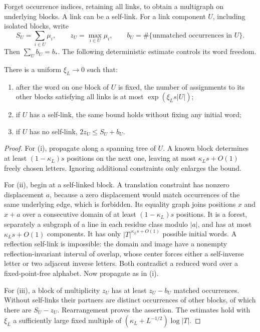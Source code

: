 Forget occurrence indices, retaining all links, to obtain a multigraph on underlying blocks. A link can be a self-link. For a link component $U$, including isolated blocks, write
\[
 S_U=\sum_{i\in U}\mu_i,\qquad z_U=\max_{i\in U}\mu_i,
 \qquad b_U=\#\{\text{unmatched occurrences in }U\}.
\]
Then $\sum_U b_U=b_*$. The following deterministic estimate controls its word freedom.
\begin{lemma}\label{lem:link-freedom}
There is a uniform $\xi_L\to0$ such that:
\begin{enumerate}[label=\textup{(\roman*)},leftmargin=2em]
\item after the word on one block of $U$ is fixed, the number of assignments to its other blocks satisfying all links is at most $\exp(\xi_Ls|U|)$;
\item if $U$ has a self-link, the same bound holds without fixing any initial word;
\item if $U$ has no self-link, $2z_U\le S_U+b_U$.
\end{enumerate}
\end{lemma}
\begin{proof}
For (i), propagate along a spanning tree of $U$. A known block determines at least $(1-\kappa_L)s$ positions on the next one, leaving at most $\kappa_Ls+O(1)$ freely chosen letters. Ignoring additional constraints only enlarges the bound.

For (ii), begin at a self-linked block. A translation constraint has nonzero displacement $a$, because a zero displacement would match occurrences of the same underlying edge, which is forbidden. Its equality graph joins positions $x$ and $x+a$ over a consecutive domain of at least $(1-\kappa_L)s$ positions. It is a forest, separately a subgraph of a line in each residue class modulo $|a|$, and has at most $\kappa_Ls+O(1)$ components. It has only $|T|^{\kappa_Ls+O(1)}$ possible initial words. A reflection self-link is impossible: the domain and image have a nonempty reflection-invariant interval of overlap, whose center forces either a self-inverse letter or two adjacent inverse letters. Both contradict a reduced word over a fixed-point-free alphabet. Now propagate as in (i).

For (iii), a block of multiplicity $z_U$ has at least $z_U-b_U$ matched occurrences. Without self-links their partners are distinct occurrences of other blocks, of which there are $S_U-z_U$. Rearrangement proves the assertion. The estimates hold with $\xi_L$ a sufficiently large fixed multiple of $(\kappa_L+L^{-1/2})\log|T|$.
\end{proof}

